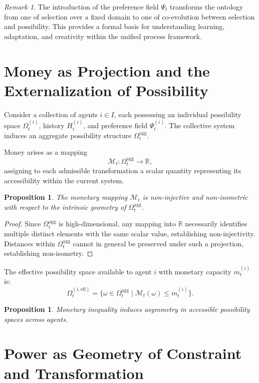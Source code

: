 \documentclass[11pt,a4paper]{article}
\newtheorem{proposition}[theorem]{Proposition}
\theoremstyle{definition}
\theoremstyle{remark}
\newtheorem{remark}[theorem]{Remark}
\begin{document}
\begin{remark}
The introduction of the preference field $\Psi_t$ transforms the ontology from one of selection over a fixed domain to one of co-evolution between selection and possibility. This provides a formal basis for understanding learning, adaptation, and creativity within the unified process framework.
\end{remark}

\section{Money as Projection and the Externalization of Possibility}

Consider a collection of agents $i \in I$, each possessing an individual possibility space $\Omega_t^{(i)}$, history $H_t^{(i)}$, and preference field $\Psi_t^{(i)}$. The collective system induces an aggregate possibility structure $\Omega_t^{\mathrm{agg}}$.

Money arises as a mapping
\[
\mathcal{M}_t : \Omega_t^{\mathrm{agg}} \rightarrow \mathbb{R},
\]
assigning to each admissible transformation a scalar quantity representing its accessibility within the current system.

\begin{proposition}
The monetary mapping $\mathcal{M}_t$ is non-injective and non-isometric with respect to the intrinsic geometry of $\Omega_t^{\mathrm{agg}}$.
\end{proposition}

\begin{proof}
Since $\Omega_t^{\mathrm{agg}}$ is high-dimensional, any mapping into $\mathbb{R}$ necessarily identifies multiple distinct elements with the same scalar value, establishing non-injectivity. Distances within $\Omega_t^{\mathrm{agg}}$ cannot in general be preserved under such a projection, establishing non-isometry.
\end{proof}

The effective possibility space available to agent $i$ with monetary capacity $m_t^{(i)}$ is:
\[
\Omega_t^{(i,\mathrm{eff})} = \{ \omega \in \Omega_t^{\mathrm{agg}} \mid \mathcal{M}_t(\omega) \leq m_t^{(i)} \}.
\]

\begin{proposition}
Monetary inequality induces asymmetry in accessible possibility spaces across agents.
\end{proposition}

\section{Power as Geometry of Constraint and Transformation}
\end{document}
